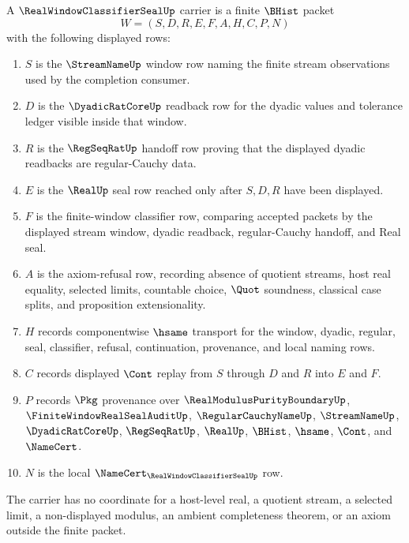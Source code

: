 \begin{definition}
\label{def:real-window-classifier-seal-carrier}
A $\RealWindowClassifierSealUp$ carrier is a finite $\BHist$ packet
$$
W=(S,D,R,E,F,A,H,C,P,N)
$$
with the following displayed rows:
\begin{enumerate}
\item $S$ is the $\StreamNameUp$ window row naming the finite stream observations used by the completion consumer.
\item $D$ is the $\DyadicRatCoreUp$ readback row for the dyadic values and tolerance ledger visible inside that window.
\item $R$ is the $\RegSeqRatUp$ handoff row proving that the displayed dyadic readbacks are regular-Cauchy data.
\item $E$ is the $\RealUp$ seal row reached only after $S,D,R$ have been displayed.
\item $F$ is the finite-window classifier row, comparing accepted packets by the displayed stream window, dyadic readback, regular-Cauchy handoff, and Real seal.
\item $A$ is the axiom-refusal row, recording absence of quotient streams, host real equality, selected limits, countable choice, $\Quot$ soundness, classical case splits, and proposition extensionality.
\item $H$ records componentwise $\hsame$ transport for the window, dyadic, regular, seal, classifier, refusal, continuation, provenance, and local naming rows.
\item $C$ records displayed $\Cont$ replay from $S$ through $D$ and $R$ into $E$ and $F$.
\item $P$ records $\Pkg$ provenance over $\RealModulusPurityBoundaryUp$, $\FiniteWindowRealSealAuditUp$, $\RegularCauchyNameUp$, $\StreamNameUp$, $\DyadicRatCoreUp$, $\RegSeqRatUp$, $\RealUp$, $\BHist$, $\hsame$, $\Cont$, and $\NameCert$.
\item $N$ is the local $\NameCert_{\RealWindowClassifierSealUp}$ row.
\end{enumerate}
The carrier has no coordinate for a host-level real, a quotient stream, a selected limit, a non-displayed modulus, an ambient completeness theorem, or an axiom outside the finite packet.
\end{definition}

